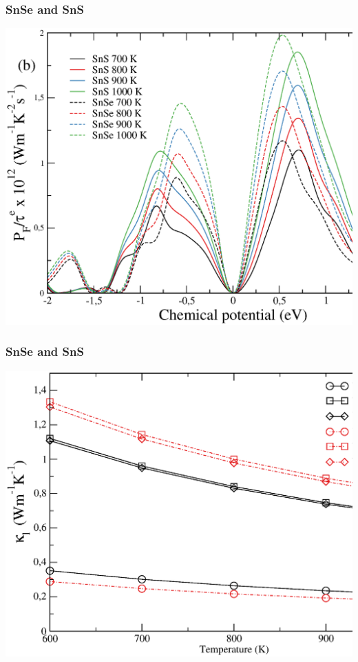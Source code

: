 \documentclass{beamer}
\begin{document}

\begin{frame}

\frametitle{SnSe and SnS}
\vspace{-0.5cm}
\begin{center}
 \includegraphics[width=0.75\linewidth]{Pictures/SnS/PF.eps}
\end{center}

\end{frame}


\begin{frame}

\frametitle{SnSe and SnS}
\vspace{-0.5cm}
\begin{center}
 \includegraphics[width=0.75\linewidth]{Pictures/SnS/tk-snsVSsnse.eps}
\end{center}

\end{frame}
\end{document}
